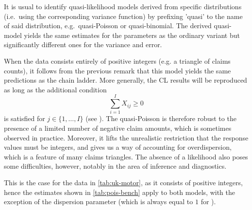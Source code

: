 \documentclass[a4paper]{book}
\begin{document}
It is usual to identify quasi-likelihood models derived from specific distributions (i.e.\ using the corresponding variance function) by prefixing 'quasi' to the name of said distribution, e.g.\ quasi-Poisson or quasi-binomial. The derived quasi-model yields the same estimates for the parameters as the ordinary variant but significantly different ones for the variance and error.

When the data consists entirely of positive integers (e.g. a triangle of claims counts), it follows from the previous remark that this model yields the same predictions as the chain ladder. More generally, the CL results will be reproduced as long as the additional condition
\begin{equation}
  \sum_{i = 1}^I X_{ij} \geq 0
\end{equation}
is satisfied for $j \in \{ 1, \dots, I \}$ (see \cite[Section 2]{renshaw}). The quasi-Poisson is therefore robust to the presence of a limited number of negative claim amounts, which is sometimes observed in practice. Moreover, it lifts the unrealistic restriction that the response values must be integers, and gives us a way of accounting for overdispersion, which is a feature of many claims triangles. The absence of a likelihood also poses some difficulties, however, notably in the area of inference and diagnostics.

This is the case for the data in \cref{tab:uk-motor}, as it consists of positive integers, hence the estimates shown in \cref{tab:pois-bench} apply to both models, with the exception of the dispersion parameter (which is always equal to $1$ for ).
\end{document}
